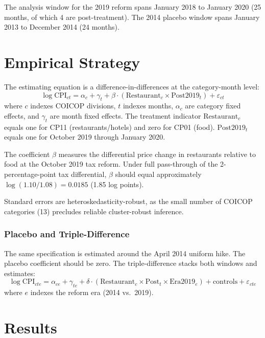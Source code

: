 \documentclass[12pt]{article}
\begin{document}
The analysis window for the 2019 reform spans January 2018 to January 2020 (25 months, of which 4 are post-treatment). The 2014 placebo window spans January 2013 to December 2014 (24 months).

\section{Empirical Strategy}

The estimating equation is a difference-in-differences at the category-month level:
\begin{equation}
  \log \text{CPI}_{ct} = \alpha_c + \gamma_t + \beta \cdot (\text{Restaurant}_c \times \text{Post2019}_t) + \varepsilon_{ct}
\end{equation}
where $c$ indexes COICOP divisions, $t$ indexes months, $\alpha_c$ are category fixed effects, and $\gamma_t$ are month fixed effects. The treatment indicator $\text{Restaurant}_c$ equals one for CP11 (restaurants/hotels) and zero for CP01 (food). $\text{Post2019}_t$ equals one for October 2019 through January 2020.

The coefficient $\beta$ measures the differential price change in restaurants relative to food at the October 2019 tax reform. Under full pass-through of the 2-percentage-point tax differential, $\beta$ should equal approximately $\log(1.10/1.08) = 0.0185$ (1.85 log points).

Standard errors are heteroskedasticity-robust, as the small number of COICOP categories (13) precludes reliable cluster-robust inference.

\subsubsection*{Placebo and Triple-Difference} The same specification is estimated around the April 2014 uniform hike. The placebo coefficient should be zero. The triple-difference stacks both windows and estimates:
\begin{equation}
  \log \text{CPI}_{cte} = \alpha_{ce} + \gamma_{te} + \delta \cdot (\text{Restaurant}_c \times \text{Post}_t \times \text{Era2019}_e) + \text{controls} + \varepsilon_{cte}
\end{equation}
where $e$ indexes the reform era (2014 vs.\ 2019).

\section{Results}
\end{document}
